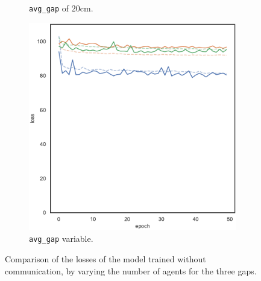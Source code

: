 \begin{figure}[!htb]
\begin{center}
\begin{subfigure}[h]{0.32\textwidth}
			\caption{\texttt{avg\_gap} of $20$\gls{cm}.}
		\end{subfigure}
		\hfill
		\begin{subfigure}[h]{0.32\textwidth}
			\includegraphics[width=\textwidth]{contents/images/task1-comm-extension/loss-distributed-gap_var@copy}
			\caption{\texttt{avg\_gap} variable.}
		\end{subfigure}
	\end{center}
	\vspace{-0.5cm}
	\caption[Losses summary of the second set of experiments (no 
	communication).]{Comparison of the losses of the model trained without 
		communication, by varying the number of agents for the three gaps.}
	\label{fig:distlossgapsexte}
\end{figure}
